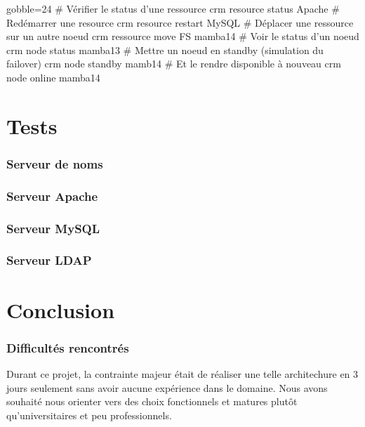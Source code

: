 \documentclass[11pt,a4paper]{report}
\begin{document}
                    \begin{bashcode*}{gobble=24}
                        # Vérifier le status d'une ressource
                        crm resource status Apache
                        # Redémarrer une resource
                        crm resource restart MySQL
                        # Déplacer une ressource sur un autre noeud
                        crm ressource move FS mamba14
                        # Voir le status d'un noeud
                        crm node status mamba13
                        # Mettre un noeud en standby (simulation du failover)
                        crm node standby mamb14
                        # Et le rendre disponible à nouveau
                        crm node online mamba14
                    \end{bashcode*}
                    
    \part{Tests}
        \section{Serveur de noms}
        \section{Serveur Apache}
        \section{Serveur MySQL}
        \section{Serveur LDAP}
    \part{Conclusion}
        \section{Difficultés rencontrés}
            
            Durant ce projet, la contrainte majeur était de réaliser une telle architechure en 3 jours seulement sans avoir aucune expérience dans le domaine. Nous avons souhaité nous orienter vers des choix fonctionnels et matures plutôt qu'universitaires et peu professionnels.\\
            
\end{document}
